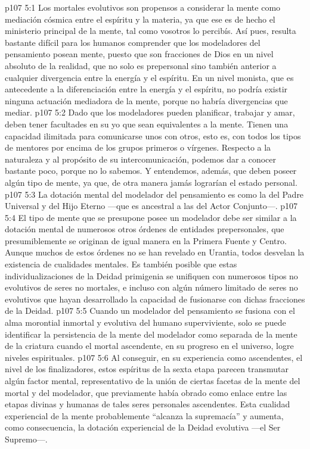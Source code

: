 \vs p107 5:1 Los mortales evolutivos son propensos a considerar la mente como mediación cósmica entre el espíritu y la materia, ya que ese es de hecho el ministerio principal de la mente, tal como vosotros lo percibís. Así pues, resulta bastante difícil para los humanos comprender que los modeladores del pensamiento posean mente, puesto que son fracciones de Dios en un nivel absoluto de la realidad, que no solo es prepersonal sino también anterior a cualquier divergencia entre la energía y el espíritu. En un nivel monista, que es antecedente a la diferenciación entre la energía y el espíritu, no podría existir ninguna actuación mediadora de la mente, porque no habría divergencias que mediar.
\vs p107 5:2 Dado que los modeladores pueden planificar, trabajar y amar, deben tener facultades en su yo que sean equivalentes a la mente. Tienen una capacidad ilimitada para comunicarse unos con otros, esto es, con todos los tipos de mentores por encima de los grupos primeros o vírgenes. Respecto a la naturaleza y al propósito de su intercomunicación, podemos dar a conocer bastante poco, porque no lo sabemos. Y entendemos, además, que deben poseer algún tipo de mente, ya que, de otra manera jamás lograrían el estado personal.
\vs p107 5:3 La dotación mental del modelador del pensamiento es como la  del Padre Universal y del Hijo Eterno ---que es ancestral a las  del Actor Conjunto---.
\vs p107 5:4 El tipo de mente que se presupone posee un modelador debe ser similar a la dotación mental de numerosos otros órdenes de entidades prepersonales, que presumiblemente se originan de igual manera en la Primera Fuente y Centro. Aunque muchos de estos órdenes no se han revelado en Urantia, todos desvelan la existencia de cualidades mentales. Es también posible que estas individualizaciones de la Deidad primigenia se unifiquen con numerosos tipos no evolutivos de seres no mortales, e incluso con algún número limitado de seres no evolutivos que hayan desarrollado la capacidad de fusionarse con dichas fracciones de la Deidad.
\vs p107 5:5 Cuando un modelador del pensamiento se fusiona con el alma morontial inmortal y evolutiva del humano superviviente, solo se puede identificar la persistencia de la mente del modelador como separada de la mente de la criatura cuando el mortal ascendente, en su progreso en el universo, logre niveles espirituales.
\vs p107 5:6 Al conseguir, en su experiencia como ascendentes, el nivel de los finalizadores, estos espíritus de la sexta etapa parecen transmutar algún factor mental, representativo de la unión de ciertas facetas de la mente del mortal y del modelador, que previamente había obrado como enlace entre las etapas divinas y humanas de tales seres personales ascendentes. Esta cualidad experiencial de la mente probablemente “alcanza la supremacía” y aumenta, como consecuencia, la dotación experiencial de la Deidad evolutiva ---el Ser Supremo---.
